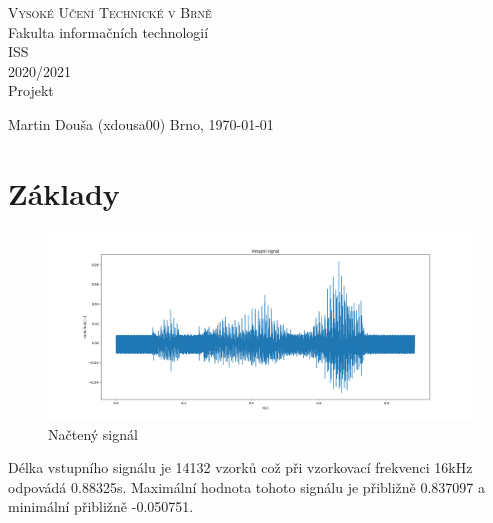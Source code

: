 \documentclass{article}
\begin{document}
\clearpage
\begin{titlepage}
	\begin{center}
		\textsc{\LARGE Vysoké Učení Technické v Brně}\\[0.5cm]
		{\LARGE Fakulta informačních technologií }\\[4.0cm]

		\textsc{\LARGE ISS}\\[0.5cm]
		\textsc{\LARGE 2020/2021}\\[3.5cm]

		{\LARGE Projekt}\\[1.0cm]
	\end{center}

	\vfill 

	\begin{flushleft} 
		\large
		Martin Douša (xdousa00)
		\hfill
		Brno, \today
	\end{flushleft}
\end{titlepage}
\thispagestyle{empty}

\newpage
\tableofcontents

\newpage
\listoffigures

\newpage

\section{Základy}
\begin{figure}[H] 
    \centering
    \includegraphics[scale=0.35,keepaspectratio]{Figure_1}
    \caption{Načtený signál}
\end{figure}

Délka vstupního signálu je 14132 vzorků což při vzorkovací frekvenci 16kHz odpovádá 0.88325s.
Maximální hodnota tohoto signálu je přibližně 0.837097 a minimální přibližně -0.050751.
\end{document}
